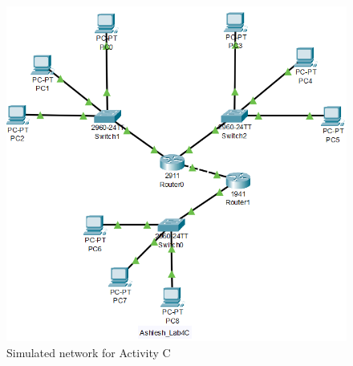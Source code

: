 \documentclass{lab_sheet}
\begin{document}
    \begin{figure}[H]
        \centering
        \includegraphics[scale=0.7]{./Figures/activityc.png}
        \caption{Simulated network for Activity C}
        \label{fig:activityc}
    \end{figure}
\end{document}
